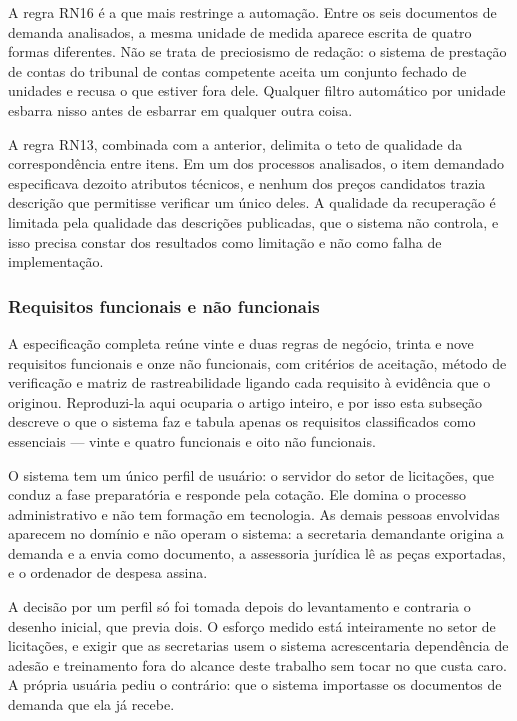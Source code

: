 A regra RN16 é a que mais restringe a automação. Entre os seis documentos de
demanda analisados, a mesma unidade de medida aparece escrita de quatro formas
diferentes. Não se trata de preciosismo de redação: o sistema de prestação de
contas do tribunal de contas competente aceita um conjunto fechado de unidades e
recusa o que estiver fora dele. Qualquer filtro automático por unidade esbarra
nisso antes de esbarrar em qualquer outra coisa.

A regra RN13, combinada com a anterior, delimita o teto de qualidade da
correspondência entre itens. Em um dos processos analisados, o item demandado
especificava dezoito atributos técnicos, e nenhum dos preços candidatos trazia
descrição que permitisse verificar um único deles. A qualidade da recuperação é
limitada pela qualidade das descrições publicadas, que o sistema não controla, e
isso precisa constar dos resultados como limitação e não como falha de
implementação.

\subsubsection{Requisitos funcionais e não funcionais}
\label{subsec:requisitos}

A especificação completa reúne vinte e duas regras de negócio, trinta e nove
requisitos funcionais e onze não funcionais, com critérios de aceitação, método
de verificação e matriz de rastreabilidade ligando cada requisito à evidência que
o originou. Reproduzi-la aqui ocuparia o artigo inteiro, e por isso esta
subseção descreve o que o sistema faz e tabula apenas os requisitos
classificados como essenciais — vinte e quatro funcionais e oito não
funcionais.

O sistema tem um único perfil de usuário: o servidor do setor de licitações, que
conduz a fase preparatória e responde pela cotação. Ele domina o processo
administrativo e não tem formação em tecnologia. As demais pessoas envolvidas
aparecem no domínio e não operam o sistema: a secretaria demandante origina a
demanda e a envia como documento, a assessoria jurídica lê as peças exportadas, e
o ordenador de despesa assina.

A decisão por um perfil só foi tomada depois do levantamento e contraria o
desenho inicial, que previa dois. O esforço medido está inteiramente no setor de
licitações, e exigir que as secretarias usem o sistema acrescentaria dependência
de adesão e treinamento fora do alcance deste trabalho sem tocar no que custa
caro. A própria usuária pediu o contrário: que o sistema importasse os documentos
de demanda que ela já recebe.

